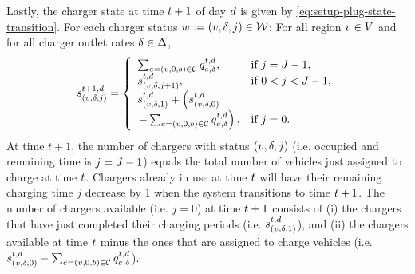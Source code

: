 Lastly, the charger state at time $t + 1$ of day $d$ is given by \eqref{eq:setup-plug-state-transition}. For each charger status $w_{} := (v, \delta, j) \in \mathcal{W}$: For all region $v \in V$ and for all charger outlet rates $\delta \in \Delta$,
\begin{align}\label{eq:setup-plug-state-transition}
     s_{(v, \delta, j)}^{t + 1, d} = \left\{
     \begin{array}{ll}
                  \sum_{c_{} = (v, 0, b) \in \mathcal{C}} q^{t,d}_{c_{}, \delta},  & \text{if } j=J - 1, \\
                  s_{(v, \delta, j + 1)}^{t, d}, & \text{if } 0 < j< J - 1,\\
                  s_{(v, \delta, 1)}^{t, d} + \left(s_{(v, \delta, 0)}^{t, d}\right. \\
                  \left.- \sum_{c_{} = (v, 0, b) \in \mathcal{C}} q^{t,d}_{c_{}, \delta}\right), & \text{if } j=0.
     \end{array}
     \right.
\end{align}
At time $t+1$, the number of chargers with status $(v, \delta, j)$ (i.e. occupied and remaining time is $j = J - 1$) equals the total number of vehicles just assigned to charge at time $t$. Chargers already in use at time $t$ will have their remaining charging time $j$ decrease by 1 when the system transitions to time $t + 1$. The number of chargers available (i.e. $j=0$) at time $t + 1$ consists of (i) the chargers that have just completed their charging periods (i.e. $s_{(v, \delta, 1)}^{t, d}$), and (ii) the chargers available at time $t$ minus the ones that are assigned to charge vehicles (i.e. $s_{(v, \delta, 0)}^{t, d} - \sum_{c_{} = (v, 0, b) \in \mathcal{C}} q^{t, d}_{c_{}, \delta}$).

